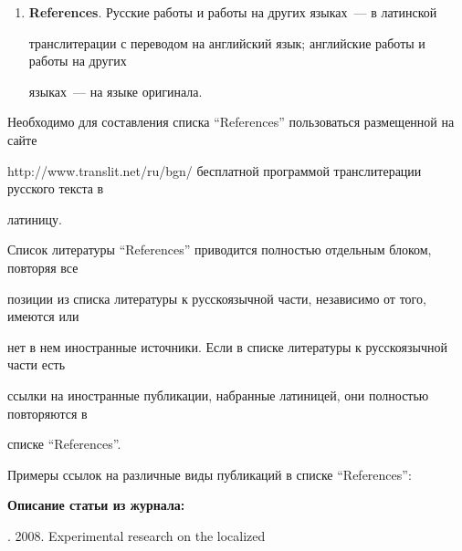 {{\begin{enumerate}[1.]
\begin{enumerate}[(1)]
работы~---  на языке и в алфавите оригинала.


\item  \textbf{References}. Русские работы и работы на других языках~--- в латинской


транслитерации с переводом на английский язык; английские работы и работы на других


языках~--- на языке оригинала.\\[-14pt]


\end{enumerate}





Необходимо для составления списка ``References'' пользоваться размещенной на сайте


{\sf http://www.translit.net/ru/bgn/} бесплатной программой транслитерации русского текста в


латиницу.  %





Список литературы ``References'' приводится полностью отдельным блоком, повторяя все


позиции из списка литературы к русскоязычной части, независимо от того, имеются или


нет в нем иностранные источники. Если в списке литературы к русскоязычной части есть


ссылки на иностранные публикации, набранные латиницей, они полностью повторяются в


списке ``References''.





Примеры ссылок на различные виды публикаций в списке ``References'':










{\small





\noindent


\textbf{Описание статьи из журнала:}








. 2008. Experimental research on the localized


}
\end{enumerate}}}
